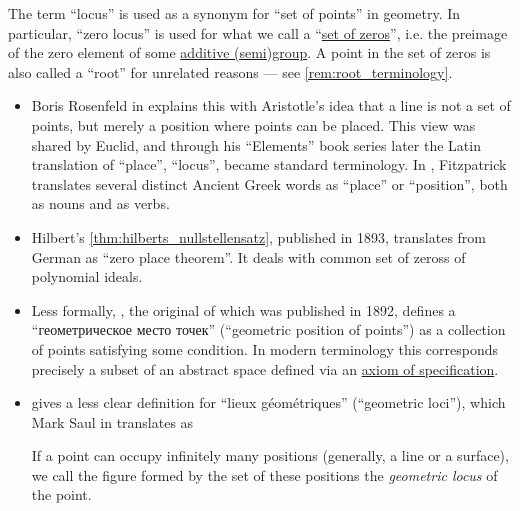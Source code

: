 \begin{remark}\label{rem:locus_terminology}
  The term \enquote{locus} is used as a synonym for \enquote{set of points} in geometry. In particular, \enquote{zero locus} is used for what we call a \enquote{\hyperref[def:zero_of_function]{set of zeros}}, i.e. the preimage of the zero element of some \hyperref[con:additive_semigroup]{additive (semi)group}. A point in the set of zeros is also called a \enquote{root} for unrelated reasons --- see \cref{rem:root_terminology}.

  \begin{itemize}
    \item Boris Rosenfeld in \cite[17]{АлександровМаркушевичХинчинИПр1963ЭнциклопедияТом4} explains this with Aristotle's idea that a line is not a set of points, but merely a position where points can be placed. This view was shared by Euclid, and through his \enquote{Elements} book series later the Latin translation of \enquote{place}, \enquote{locus}, became standard terminology. In \cite{Euclids2008Elements}, Fitzpatrick translates several distinct Ancient Greek words as \enquote{place} or \enquote{position}, both as nouns and as verbs.

    \item Hilbert's \cref{thm:hilberts_nullstellensatz}, published in 1893, translates from German as \enquote{zero place theorem}. It deals with common set of zeross of polynomial ideals.

    \item Less formally, , the original of which was published in 1892, defines a \enquote{геометрическое место точек} (\enquote{geometric position of points}) as a collection of points satisfying some condition. In modern terminology this corresponds precisely a subset of an abstract space defined via an \hyperref[def:zfc/specification]{axiom of specification}.

    \item {} gives a less clear definition for \enquote{lieux géométriques} (\enquote{geometric loci}), which Mark Saul in \cite[1]{Hadamard2008LessonsInGeometryVol1} translates as
    \begin{displayquote}
      If a point can occupy infinitely many positions (generally, a line or a surface), we call the figure formed by the set of these positions the \textit{geometric locus} of the point.
    \end{displayquote}
  \end{itemize}
\end{remark}

